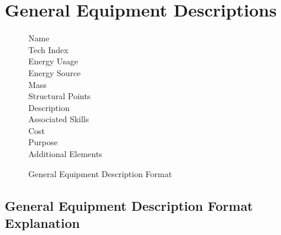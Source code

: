 \chapter{General Equipment Descriptions}

\begin{figure}[htb]
\caption{General Equip\-ment De\-scrip\-tion For\-mat}
	\begin{description}
		\item[Name]
		\item[Tech Index]
		\item[Energy Usage]
		\item[Energy Source]
		\item[Mass]
		\item[Structural Points]
		\item[Description]
		\item[Associated Skills ]
		\item[Cost]
		\item[Purpose ]
		\item[Additional Elements]
	\end{description}
\end{figure}

\section{General Equipment De\-scrip\-tion For\-mat Explanation}


